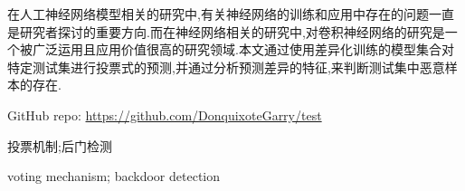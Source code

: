 

\begin{zhaiyao}
\begin{spacing}{1.5}
{

在人工神经网络模型相关的研究中,有关神经网络的训练和应用中存在的问题一直是研究者探讨的重要方向.而在神经网络相关的研究中,对卷积神经网络的研究是一个被广泛运用且应用价值很高的研究领域.本文通过使用差异化训练的模型集合对特定测试集进行投票式的预测,并通过分析预测差异的特征,来判断测试集中恶意样本的存在.

GitHub repo: \url{https://github.com/DonquixoteGarry/test}
}
\end{spacing}
\end{zhaiyao}

\begin{guanjianci}
投票机制;后门检测
\end{guanjianci}



\begin{abstract}
\begin{spacing}{1.5}

In the research of ANN's models, the puzzles about training and application of them are always a main direction for researchers. And in the research of DNN, CNN is a widely applied direction with high value. In this essay, via the predicting the results for test dataset by a model set which is trained with different training dataset, we can analysis the features about them and distinguish differences of malicious samples and normal samples.

\end{spacing}
\end{abstract}


\begin{keywords}
voting mechanism; backdoor detection
\end{keywords} 